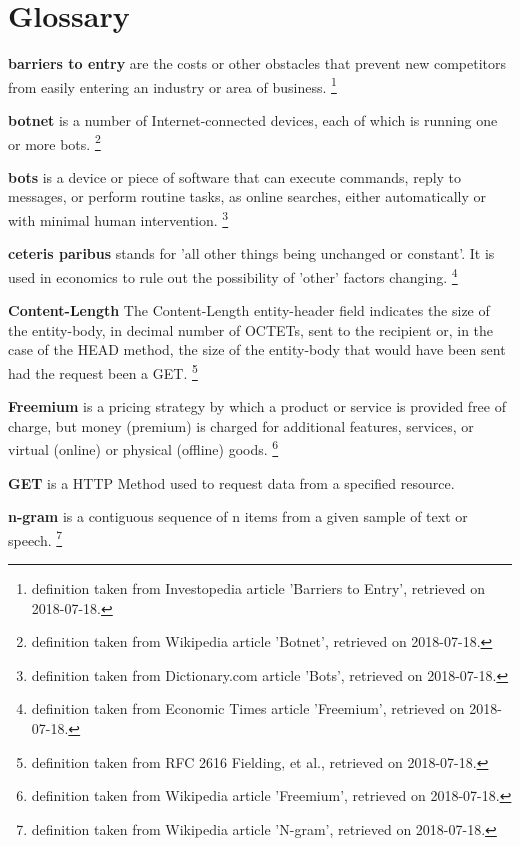 
\chapter{Glossary} %

\label{Glossary} %

\noindent \textbf{barriers to entry} are the costs or other obstacles that prevent new competitors from easily entering an industry or area of business. \footnote{definition taken from Investopedia article 'Barriers to Entry', retrieved on 2018-07-18.}

\noindent \textbf{botnet} is a number of Internet-connected devices, each of which is running one or more bots. \footnote{definition taken from Wikipedia article 'Botnet', retrieved on 2018-07-18.}

\noindent \textbf{bots} is a device or piece of software that can execute commands, reply to messages, or perform routine tasks, as online searches, either automatically or with minimal human intervention. \footnote{definition taken from Dictionary.com article 'Bots', retrieved on 2018-07-18.}

\noindent \textbf{ceteris paribus} stands for 'all other things being unchanged or constant'. It is used in economics to rule out the possibility of 'other' factors changing. \footnote{definition taken from Economic Times article 'Freemium', retrieved on 2018-07-18.}

\noindent \textbf{Content-Length} The Content-Length entity-header field indicates the size of the entity-body, in decimal number of OCTETs, sent to the recipient or, in the case of the HEAD method, the size of the entity-body that would have been sent had the request been a GET. \footnote{definition taken from RFC 2616 Fielding, et al., retrieved on 2018-07-18.}

\noindent \textbf{Freemium} is a pricing strategy by which a product or service is provided free of charge, but money (premium) is charged for additional features, services, or virtual (online) or physical (offline) goods. \footnote{definition taken from Wikipedia article 'Freemium', retrieved on 2018-07-18.}

\noindent \textbf{GET} is a HTTP Method used to request data from a specified resource.

\noindent \textbf{n-gram} is a contiguous sequence of n items from a given sample of text or speech. \footnote{definition taken from Wikipedia article 'N-gram', retrieved on 2018-07-18.}

